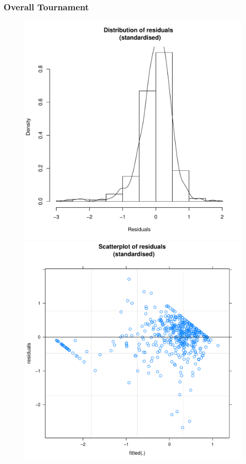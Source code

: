 \begin{CJK}{UTF8}{gbsn}
      \subsubsection{Overall Tournament\label{app8:prediction1bOverall}}



            \begin{figure}[htbp]
              \includegraphics[scale =.4]{images/MLM31bHist.pdf}
              \includegraphics[scale =.4]{images/MLM31bScatter.pdf}

\end{figure}
\end{CJK}
